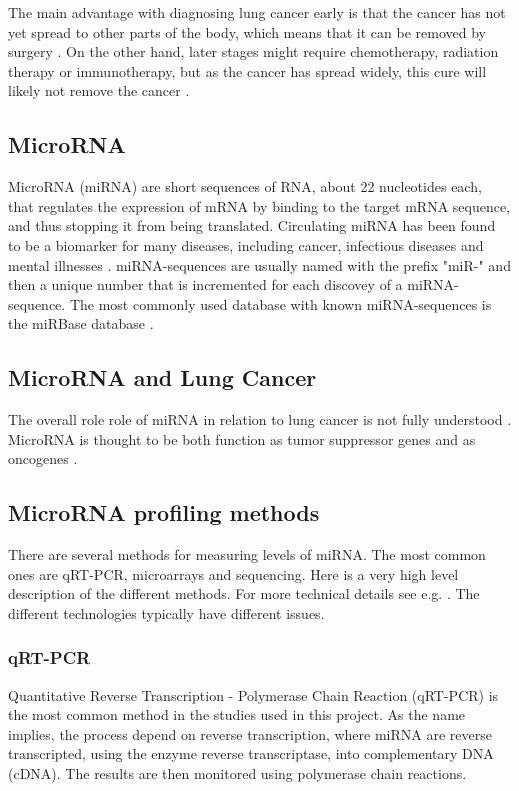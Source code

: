 The main advantage with diagnosing lung cancer early is that the cancer has not yet spread to other parts of the body, which means that it can be removed by surgery \citep{cancertreatment}. On the other hand, later stages might require chemotherapy, radiation therapy or immunotherapy, but as the cancer has spread widely, this cure will likely not remove the cancer \citep{cancertreatment}.


\subsection{MicroRNA}

MicroRNA (miRNA) are short sequences of RNA, about 22 nucleotides each, that regulates the expression of mRNA by binding to the target mRNA sequence, and thus stopping it from being translated. Circulating miRNA has been found to be a biomarker for many diseases, including cancer, infectious diseases and mental illnesses \citep{mirnabiomarker,mirnabiomarker2,mirnabiomarker3,mirnabiomarker4}. miRNA-sequences are usually named with the prefix "miR-" and then a unique number that is incremented for each discovey of a miRNA-sequence. The most commonly used database with known miRNA-sequences is the miRBase database \citep{mirbase}.

\subsection{MicroRNA and Lung Cancer}

The overall role role of miRNA in relation to lung cancer is not fully understood \citep{mirnarole}. MicroRNA is thought to be both function as tumor suppressor genes and as oncogenes \citep{mirnarole2}. 

\subsection{MicroRNA profiling methods}

There are several methods for measuring levels of miRNA. The most common ones are qRT-PCR, microarrays and sequencing. Here is a very high level description of the different methods. For more technical details see e.g. \citet{mirnatech}. The different technologies typically have different issues.

\subsubsection{qRT-PCR}
Quantitative Reverse Transcription - Polymerase Chain Reaction (qRT-PCR) is the most common method in the studies used in this project. As the name implies, the process depend on reverse transcription, where miRNA are reverse transcripted, using the enzyme reverse transcriptase, into complementary DNA (cDNA). The results are then monitored using polymerase chain reactions.

